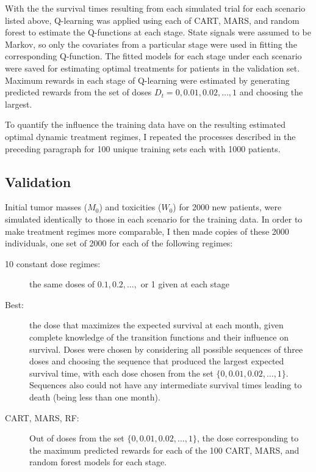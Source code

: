\documentclass[12pt]{article}
\begin{document}
With the the survival times resulting from each simulated trial for each scenario listed above, Q-learning was applied using each of CART, MARS, and random forest to estimate the Q-functions at each stage. State signals were assumed to be Markov, so only the covariates from a particular stage were used in fitting the corresponding Q-function. The fitted models for each stage under each scenario were saved for estimating optimal treatments for patients in the validation set.  Maximum rewards in each stage of Q-learning were estimated by generating predicted rewards from the set of doses $D_{t} = 0, 0.01, 0.02, \ldots, 1$ and choosing the largest.

To quantify the influence the training data have on the resulting estimated optimal dynamic treatment regimes, I repeated the processes described in the preceding paragraph for 100 unique training sets each with 1000 patients.


\subsection{Validation} %
\label{sub:validation}

Initial tumor masses ($M_{0}$) and toxicities ($W_{0}$) for 2000 new patients, were simulated identically to those in each scenario for the training data. In order to make treatment regimes more comparable, I then made copies of these 2000 individuals, one set of 2000 for each of the following regimes:

\begin{description}
  \item [10 constant dose regimes:] the same doses of $0.1, 0.2, \ldots,$ or 1 given at each stage
  \item [Best:] the dose that maximizes the expected survival at each month, given complete knowledge of the transition functions and their influence on survival. Doses were chosen by considering all possible sequences of three doses and choosing the sequence that produced the largest expected survival time, with each dose chosen from the set $\{0, 0.01, 0.02, \ldots, 1\}$. Sequences also could not have any intermediate survival times leading to death (being less than one month).
  \item [CART, MARS, RF:] Out of doses from the set $\{0, 0.01, 0.02, \ldots, 1\}$, the dose corresponding to the maximum predicted rewards for each of the 100 CART, MARS, and random forest models for each stage.
\end{description}
\end{document}
